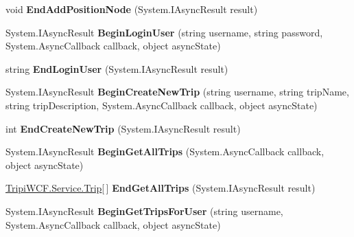 \begin{DoxyCompactItemize}
\item 
\hypertarget{interface_i_trip_service_ac8238f88b8fd49bb1b9fb44dc1029c75}{
void {\bfseries EndAddPositionNode} (System.IAsyncResult result)}
\label{interface_i_trip_service_ac8238f88b8fd49bb1b9fb44dc1029c75}

\item 
\hypertarget{interface_i_trip_service_a3cfbf7045ee856c9e0d1753f992cb53f}{
System.IAsyncResult {\bfseries BeginLoginUser} (string username, string password, System.AsyncCallback callback, object asyncState)}
\label{interface_i_trip_service_a3cfbf7045ee856c9e0d1753f992cb53f}

\item 
\hypertarget{interface_i_trip_service_a21f809101de7e9dada87257f2a8c7e0c}{
string {\bfseries EndLoginUser} (System.IAsyncResult result)}
\label{interface_i_trip_service_a21f809101de7e9dada87257f2a8c7e0c}

\item 
\hypertarget{interface_i_trip_service_ae3fabcd67ada0535675545b896783a1d}{
System.IAsyncResult {\bfseries BeginCreateNewTrip} (string username, string tripName, string tripDescription, System.AsyncCallback callback, object asyncState)}
\label{interface_i_trip_service_ae3fabcd67ada0535675545b896783a1d}

\item 
\hypertarget{interface_i_trip_service_a4ab63e3c4e872d664327bb05567a8f00}{
int {\bfseries EndCreateNewTrip} (System.IAsyncResult result)}
\label{interface_i_trip_service_a4ab63e3c4e872d664327bb05567a8f00}

\item 
\hypertarget{interface_i_trip_service_ab525f5aa33b4435b09cc95e931f2a31d}{
System.IAsyncResult {\bfseries BeginGetAllTrips} (System.AsyncCallback callback, object asyncState)}
\label{interface_i_trip_service_ab525f5aa33b4435b09cc95e931f2a31d}

\item 
\hypertarget{interface_i_trip_service_a9d8cd1ccbde0f4a84bf990c2287ab336}{
\hyperlink{class_tripi_w_c_f_1_1_service_1_1_trip}{TripiWCF.Service.Trip}\mbox{[}$\,$\mbox{]} {\bfseries EndGetAllTrips} (System.IAsyncResult result)}
\label{interface_i_trip_service_a9d8cd1ccbde0f4a84bf990c2287ab336}

\item 
\hypertarget{interface_i_trip_service_abdab35d0a03c32a7fcdb9b7e21840466}{
System.IAsyncResult {\bfseries BeginGetTripsForUser} (string username, System.AsyncCallback callback, object asyncState)}
\label{interface_i_trip_service_abdab35d0a03c32a7fcdb9b7e21840466}


\end{DoxyCompactItemize}
